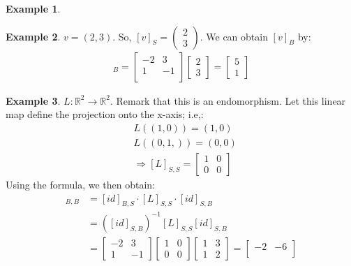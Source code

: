 \documentclass[a4paper, 12pt]{article}
\theoremstyle{definition}
\newtheorem{exmp}{Example}[section]
\theoremstyle{definition}
\theoremstyle{definition}
\theoremstyle{definition}
\begin{document}
{\begin{exmp}
\end{exmp}
\begin{exmp}
	$v = (2,3)$. So, $[v]_S = \begin{pmatrix}
		2 \\ 3 
	\end{pmatrix}$. We can obtain $[v]_B$ by: 
	\begin{align*}
		[v]_B = \begin{bmatrix}
			-2 & 3 \\
			1 & -1 \\ 
		\end{bmatrix} \begin{bmatrix}
			2 \\
			3 
		\end{bmatrix} = \begin{bmatrix}
			5 \\
			1
		\end{bmatrix}
	\end{align*}
\end{exmp}
\begin{exmp}
	$L: \mathbb{R}^2 \rightarrow \mathbb{R}^2$. Remark that this is an endomorphism. Let this linear map define the projection onto the x-axis; i.e,: 
	\begin{align*}
		& L((1,0)) = (1,0) \\
		& L((0,1,)) = (0,0) \\
		& \Rightarrow [L]_{S,S}  = \begin{bmatrix}
			1 & 0 \\
			0 & 0 
		\end{bmatrix}
	\end{align*}
	Using the formula, we then obtain: 
	\begin{align*}
		[L]_{B,B} &  = [id]_{B,S} \cdot [L]_{S,S} \cdot [id]_{S,B} \\
		& = ([id]_{S,B})^{-1} [L]_{S,S} [id]_{S,B} \\ 
		& = \begin{bmatrix}
			-2 & 3 \\
			1 & -1 
		\end{bmatrix} \begin{bmatrix}
			1 & 0 \\
			0 & 0  
		\end{bmatrix} \begin{bmatrix}
			1 & 3 \\
			1 & 2 
		\end{bmatrix} = \begin{bmatrix}
			-2 & -6 \\

\end{bmatrix}
\end{align*}
\end{exmp}}
\end{document}
